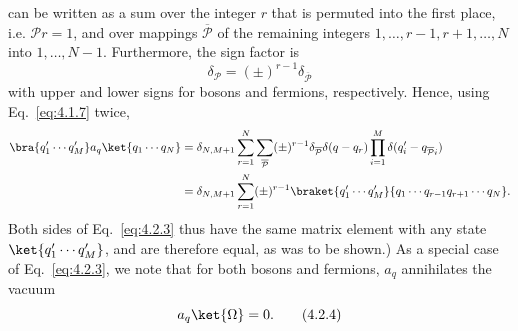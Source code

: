 can be written as a sum over the integer $r$ that is permuted into the
first place, i.e. $\mathcal P r=1$, and over mappings $\overline{\mathcal P}$ of the remaining integers
$1,\ldots,r-1,r+1,\ldots,N$ into $1,\ldots,N-1$. Furthermore, the sign factor is
\[
  \delta_{\mathcal P}=(\pm)^{r-1}\delta_{\overline{\mathcal P}}
\]
with upper and lower signs for bosons and fermions, respectively. Hence,
using Eq.~\eqref{eq:4.1.7} twice,
\begin{align*}
  \bra{q'_1\cdots q'_M}a_q\ket{q_1\cdots q_N}
  ={}& \delta_{N,M+1}
  \sum_{r=1}^{N}\sum_{\overline{\mathcal P}}(\pm)^{r-1}
  \delta_{\overline{\mathcal P}}\delta(q-q_r)
  \prod_{i=1}^{M}\delta(q'_i-q_{\overline{\mathcal P}i})
  \\
  ={}& \delta_{N,M+1}\sum_{r=1}^{N}(\pm)^{r-1}
  \braket{q'_1\cdots q'_M}{q_1\cdots q_{r-1}q_{r+1}\cdots q_N}.
\end{align*}
Both sides of Eq.~\eqref{eq:4.2.3} thus have the same matrix element with any state
$\ket{q'_1\cdots q'_M}$, and are therefore equal, as was to be shown.) As a special case
of Eq.~\eqref{eq:4.2.3}, we note that for both bosons and fermions, $a_q$ annihilates
the vacuum
\begin{equation}
  a_q\ket{\Omega}=0.
  \tag{4.2.4}
  \label{eq:4.2.4}
\end{equation}

